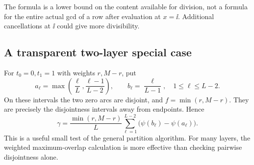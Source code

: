 The formula is a lower bound on the content available for division,
not a formula for the entire actual gcd of a row after evaluation
at \(x=\ii\). Additional cancellations at \(\ii\) could give more
divisibility.

\subsection{A transparent two-layer special case}

For \(t_0=0,t_1=1\) with weights \(r,M-r\), put
\[
a_\ell=\max\left(\frac{\ell}{L},\frac{\ell-1}{L-2}\right),
\qquad b_\ell=\frac{\ell}{L-1},
\quad 1\le\ell\le L-2.
\]
On these intervals the two zero arcs are disjoint, and
\(f=\min(r,M-r)\). They are precisely the disjointness intervals
away from endpoints. Hence
\begin{equation}\label{eq:twogamma}
\gamma=\frac{\min(r,M-r)}L
\sum_{\ell=1}^{L-2}\bigl(\psi(b_\ell)-\psi(a_\ell)\bigr).
\end{equation}
This is a useful small test of the general partition algorithm.
For many layers, the weighted maximum-overlap calculation is more
effective than checking pairwise disjointness alone.

